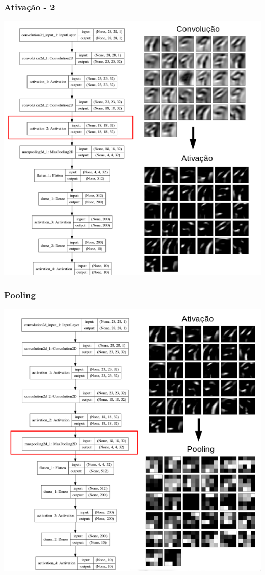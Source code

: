 \documentclass[tikz,11pt]{beamer}
\begin{document}
\begin{frame}
	\frametitle{Ativação - 2}
	\centering
	\includegraphics[height=.8\paperheight]{images/fabio/ativ_2}
\end{frame}

\begin{frame}
	\frametitle{Pooling}
	\centering
	\includegraphics[height=.8\paperheight]{images/fabio/pooling_1}
\end{frame}
\end{document}
